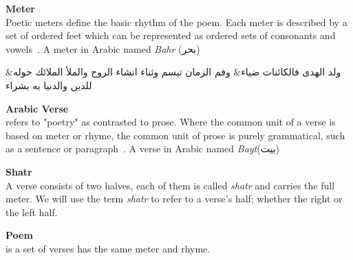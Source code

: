 
    \newpage
\begin{definition}\label{def:meter}
  \textbf{Meter} \hfill \\
  Poetic meters define the basic rhythm of the poem. Each meter is described by a set of ordered feet which can be represented as ordered sets of consonants and vowels~\cite{Almuhareb2015}. A meter in Arabic named \textit{Bahr}   (\textarabic{بحر})
\begin{Arabic}
	\begin{traditionalpoem*}
          ولد الهدى فالكائنات ضياء\quad & \quad وفم الزمان تبسم وثناء انشاء
          الروح والملأ الملائك حوله\quad & \quad للدين والدنيا به بشراء

	\end{traditionalpoem*}
\end{Arabic}%
\end{definition}

\begin{definition}\label{def:verse}
  \textbf{Arabic Verse} \hfill \\ refers to "poetry" as contrasted to prose. Where the common unit of a verse is based on meter or rhyme, the common unit of prose is purely grammatical, such as a sentence or paragraph~\cite{Wiki_Verse}. A verse in Arabic named \textit{Bayt}(\textarabic{بيت})
\end{definition}

\begin{definition}\label{def:shatr}
  \textbf{Shatr} \hfill \\  A verse consists of two halves, each of them is called \textit{shatr} and carries the full meter.  We will use the term \textit{shatr} to refer to a verse's half; whether the right or the left half.
\end{definition}

\begin{definition}\label{def:poem}
  \textbf{Poem} \hfill \\  is a set of verses has the same meter and rhyme.
\end{definition}
\newpage

